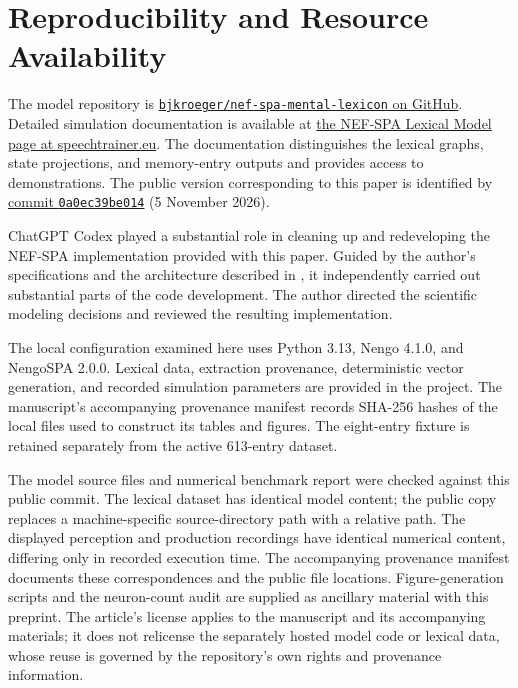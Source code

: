 \section{Reproducibility and Resource Availability}
The model repository is \href{https://github.com/bjkroeger/nef-spa-mental-lexicon}{\texttt{bjkroeger/nef-spa-mental-lexicon} on GitHub}. Detailed simulation documentation is available at \href{https://www.speechtrainer.eu/nef-spa-lexical-model.htm}{the NEF-SPA Lexical Model page at speechtrainer.eu}. The documentation distinguishes the lexical graphs, state projections, and memory-entry outputs and provides access to demonstrations. The public version corresponding to this paper is identified by \href{https://github.com/bjkroeger/nef-spa-mental-lexicon/tree/0a0ec39be0143c4d444823ebe652b00eb38638a3}{commit \texttt{0a0ec39be014}} (5 November 2026).

ChatGPT Codex played a substantial role in cleaning up and redeveloping the NEF-SPA implementation provided with this paper. Guided by the author's specifications and the architecture described in \citet{stille2020}, it independently carried out substantial parts of the code development. The author directed the scientific modeling decisions and reviewed the resulting implementation.

The local configuration examined here uses Python 3.13, Nengo 4.1.0, and NengoSPA 2.0.0. Lexical data, extraction provenance, deterministic vector generation, and recorded simulation parameters are provided in the project. The manuscript's accompanying provenance manifest records SHA-256 hashes of the local files used to construct its tables and figures. The eight-entry fixture is retained separately from the active 613-entry dataset.

The model source files and numerical benchmark report were checked against this public commit. The lexical dataset has identical model content; the public copy replaces a machine-specific source-directory path with a relative path. The displayed perception and production recordings have identical numerical content, differing only in recorded execution time. The accompanying provenance manifest documents these correspondences and the public file locations. Figure-generation scripts and the neuron-count audit are supplied as ancillary material with this preprint. The article's license applies to the manuscript and its accompanying materials; it does not relicense the separately hosted model code or lexical data, whose reuse is governed by the repository's own rights and provenance information.
